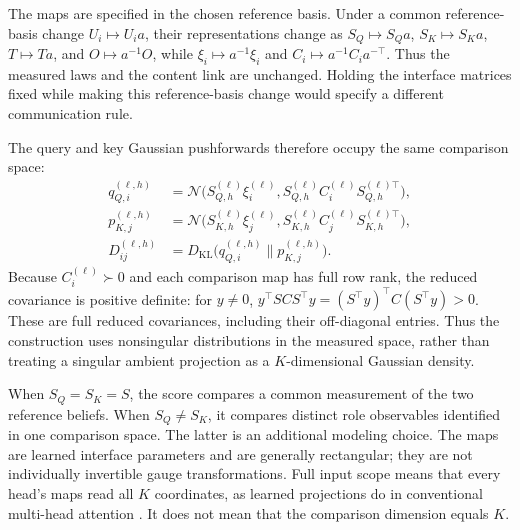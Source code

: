 \documentclass[twoside,11pt]{article}
\begin{document}
The maps are specified in the chosen reference basis. Under a common reference-basis change \(U_i\mapsto U_i a\), their representations change as \(S_Q\mapsto S_Qa\), \(S_K\mapsto S_Ka\), \(T\mapsto Ta\), and \(O\mapsto a^{-1}O\), while \(\xi_i\mapsto a^{-1}\xi_i\) and \(C_i\mapsto a^{-1}C_i a^{-\top}\). Thus the measured laws and the content link are unchanged. Holding the interface matrices fixed while making this reference-basis change would specify a different communication rule.

The query and key Gaussian pushforwards therefore occupy the same comparison space:
\begin{align}
q_{Q,i}^{(\ell,h)}
&=\mathcal N\bigl(S_{Q,h}^{(\ell)}\xi_i^{(\ell)},
 S_{Q,h}^{(\ell)}C_i^{(\ell)}S_{Q,h}^{(\ell)\top}\bigr),\label{eq:relational_query_law}\\
p_{K,j}^{(\ell,h)}
&=\mathcal N\bigl(S_{K,h}^{(\ell)}\xi_j^{(\ell)},
 S_{K,h}^{(\ell)}C_j^{(\ell)}S_{K,h}^{(\ell)\top}\bigr),\label{eq:relational_key_law}\\
D_{ij}^{(\ell,h)}
&=D_{\mathrm{KL}}\bigl(q_{Q,i}^{(\ell,h)}\|p_{K,j}^{(\ell,h)}\bigr).
\label{eq:relational_role_kl}
\end{align}
Because $C_i^{(\ell)}\succ0$ and each comparison map has full row rank, the reduced covariance is positive definite: for $y\ne0$, $y^\top SCS^\top y=(S^\top y)^\top C(S^\top y)>0$. These are full reduced covariances, including their off-diagonal entries. Thus the construction uses nonsingular distributions in the measured space, rather than treating a singular ambient projection as a $K$-dimensional Gaussian density.

When $S_Q=S_K=S$, the score compares a common measurement of the two reference beliefs. When $S_Q\ne S_K$, it compares distinct role observables identified in one comparison space. The latter is an additional modeling choice. The maps are learned interface parameters and are generally rectangular; they are not individually invertible gauge transformations. Full input scope means that every head's maps read all $K$ coordinates, as learned projections do in conventional multi-head attention \citep{vaswani2017attention}. It does not mean that the comparison dimension equals $K$.
\end{document}
